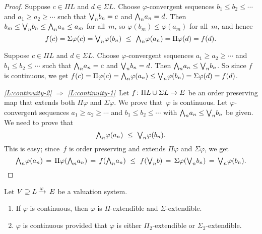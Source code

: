 \documentclass[main.tex]{subfiles}
\begin{document}
\begin{proof}
Suppose $c\in \Pi L$ and $d\in \Sigma L$.
Choose $\varphi$-convergent
 sequences $b_1 \leq b_2 \leq \dotsb$
and  $a_1 \geq a_2 \geq \dotsb$ 
such that 
$\textstyle{\bigvee}_n b_n = c$
and 
$\textstyle{\bigwedge}_n a_n = d$.
Then $b_m \leq \textstyle{\bigvee}_n b_n \leq \textstyle{\bigwedge}_n a_n \leq a_m$
for all~$m$,
so $\varphi(b_m)\leq \varphi(a_m)$ for all~$m$,
and hence
\begin{equation*}
f(c) = \Sigma\varphi(c)
= \bv_n \varphi(b_n)
\ \leq\ 
\bw_n \varphi(a_n)
= \Pi \varphi(d)
= f(d).
\end{equation*}

Suppose $c\in \Pi L$ and $d\in \Sigma L$.
Choose $\varphi$-convergent sequences $a_1 \geq a_2 \geq \dotsb$ 
and $b_1 \leq b_2 \leq \dotsb$
such that $\textstyle{\bigwedge}_n a_n = c$ and $\textstyle{\bigvee}_n b_n = d$.
Then $\textstyle{\bigwedge}_n a_n \leq \textstyle{\bigvee}_n b_n $.
So since $f$ is continuous, 
we get 
$f(c)= \Pi\varphi(c) =\textstyle{\bigwedge}_n\varphi(a_n) 
\leq\textstyle{\bigvee}_n\varphi(b_n) = \Sigma\varphi(d) = f(d)$.

\vspace{.3em}

\noindent\emph{\ref{L:continuity-2}
$\Longrightarrow$
\ref{L:continuity-1}}\ 
Let $f\colon \Pi L \cup \Sigma L \rightarrow E$
be an order preserving map that extends both $\Pi\varphi$
and $\Sigma \varphi$.
We prove that~$\varphi$ is continuous.
Let $\varphi$-convergent sequences
$a_1 \geq a_2 \geq \dotsb$
and $b_1 \leq b_2 \leq \dotsb$
with $\textstyle{\bigwedge}_n a_n \leq \textstyle{\bigvee}_n b_n$
be given.
We need to prove that  
\begin{equation*}
\textstyle{\bigwedge}_n \varphi(a_n)\ \leq\  \textstyle{\bigvee}_n \varphi(b_n).
\end{equation*}
This is easy;
since~$f$ is order preserving
and extends $\Pi\varphi$ and $\Sigma\varphi$,
we get 
\begin{equation*}
\textstyle{\bigwedge}_n \varphi(a_n)
\,=\,
\Pi\varphi(\textstyle{\bigwedge}_n a_n)
\,=\,
 f(\textstyle{\bigwedge}_n a_n)
\ \leq\  
f(\textstyle{\bigvee}_n b)
\,=\,
\Sigma\varphi(\textstyle{\bigvee}_n b_n)
\,=\,
\textstyle{\bigvee}_n \varphi(b_n).\qedhere
\end{equation*}
\end{proof}
%
%
\begin{cor}
\label{C:cont-imp}
Let $V \supseteq L\,\smash{\xrightarrow{\varphi}\,E}$ be a valuation system. 
\begin{enumerate}
\item 
\label{C:cont-imp-1}
If $\varphi$ is continuous,
then $\varphi$ is $\Pi$-extendible
and $\Sigma$-extendible.

\item 
\label{C:cont-imp-2}
$\varphi$ is continuous
provided that $\varphi$ is either $\Pi_2$-extendible
or $\Sigma_2$-extendible.
\end{enumerate}
\end{cor}
\end{document}
